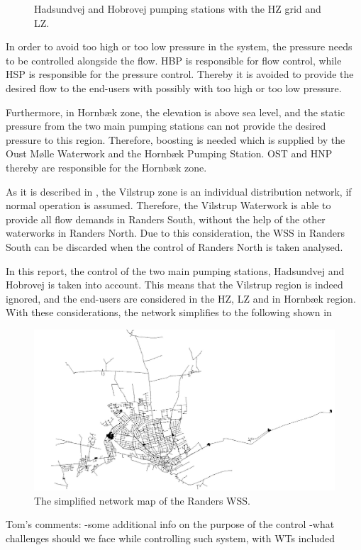 \begin{figure}[H]
\centering

\caption{Hadsundvej and Hobrovej pumping stations with the HZ grid and LZ.}
\label{fig:HBP_HSP_grid}
\end{figure}

In order to avoid too high or too low pressure in the system, the pressure needs to be controlled alongside the flow. HBP is responsible for flow control, while HSP is responsible for the pressure control. Thereby it is avoided to provide the desired flow to the end-users with possibly with too high or too low pressure. 

Furthermore, in Hornbæk zone, the elevation is above sea level, and the static pressure from the two main pumping stations can not provide the desired pressure to this region. Therefore, boosting is needed which is supplied by the Oust Mølle Waterwork and the Hornbæk Pumping Station. OST and HNP thereby are responsible for the Hornbæk zone.

As it is described in , the Vilstrup zone is an individual distribution network, if normal operation is assumed. Therefore, the Vilstrup Waterwork is able to provide all flow demands in Randers South, without the help of the other waterworks in Randers North. Due to this consideration, the WSS in Randers South can be discarded when the control of Randers North is taken analysed. 

In this report, the control of the two main pumping stations, Hadsundvej and Hobrovej is taken into account. This means that the Vilstrup region is indeed ignored, and the end-users are considered in the HZ, LZ and in Hornbæk region. With these considerations, the network simplifies to the following shown in 

\begin{figure}[H]
\centering
\includegraphics[width=1.02\textwidth]{report/pictures/verdo_pic2}
\caption{The simplified network map of the Randers WSS.}
\label{fig:simplified_network}
\end{figure}

Tom's comments:\newline
-some additional info on the purpose of the control \newline
-what challenges should we face while controlling such system, with WTs included







